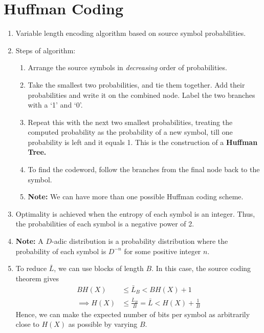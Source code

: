 \documentclass[journal,12pt,twocolumn]{IEEEtran}
\renewcommand\thesection{\arabic{section}}
\begin{document}
\section{Huffman Coding}
\begin{enumerate}[label=\thesection.\arabic*, ref=\thesection.\theenumi]
    \item Variable length encoding algorithm based on source symbol probabilities.
    \item Steps of algorithm:
    \begin{enumerate}
        \item Arrange the source symbols in \textit{decreasing} order of 
        probabilities.
        \item Take the smallest two probabilities, and tie them together.
        Add their probabilities and write it on the combined node. Label the
        two branches with a `1' and `0'.
        \item Repeat this with the next two smallest probabilities, treating 
        the computed probability as the probability of a new symbol, till one
        probability is left and it equals 1. This is the construction of a 
        \textbf{Huffman Tree.}
        \item To find the codeword, follow the branches from the final node 
        back to the symbol.
        \item \textbf{Note:} We can have more than one possible Huffman coding 
        scheme. 
    \end{enumerate}
    \item Optimality is achieved when the entropy of each symbol is an integer.
    Thus, the probabilities of each symbol is a negative power of 2.
    \item \textbf{Note:} A $D$-adic distribution is a probability distribution
    where the probability of each symbol is $D^{-n}$ for some positive integer 
    $n$. 
    \item To reduce $\bar{L}$, we can use blocks of length $B$. In this case, 
    the source coding theorem gives
    \begin{align}
        BH(X) &\le \bar{L}_B < BH(X)+1 \\
        \implies H(X) &\le \frac{\bar{L}_B}{B} = \bar{L} < H(X)+\frac{1}{B}
        \label{eq:huffman-bound}
    \end{align}
    Hence, we can make the expected number of bits per symbol as arbitrarily 
    close to $H(X)$ as possible by varying $B$.
\end{enumerate}
\end{document}
